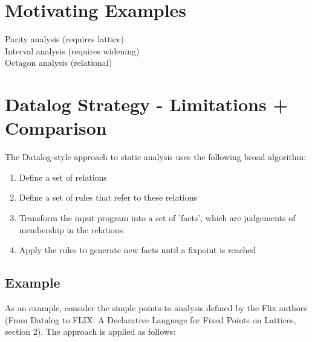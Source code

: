 \documentclass[acmlarge,anonymous]{acmart}\settopmatter{printfolios=true}
\begin{document}
\section{Motivating Examples}

Parity analysis (requires lattice)\\
Interval analysis (requires widening)\\
Octagon analysis (relational)

\section{Datalog Strategy - Limitations + Comparison}

The Datalog-style approach to static analysis uses the following broad algorithm:

\begin{enumerate}
    \item Define a set of relations
    \item Define a set of rules that refer to these relations
    \item Transform the input program into a set of 'facts', which are judgements of membership in the relations
    \item Apply the rules to generate new facts until a fixpoint is reached
\end{enumerate}

\subsection{Example}

As an example, consider the simple points-to analysis defined by the Flix authors (From Datalog to FLIX: A Declarative Language for Fixed Points on Lattices, section 2). The approach is applied as follows:
\end{document}
